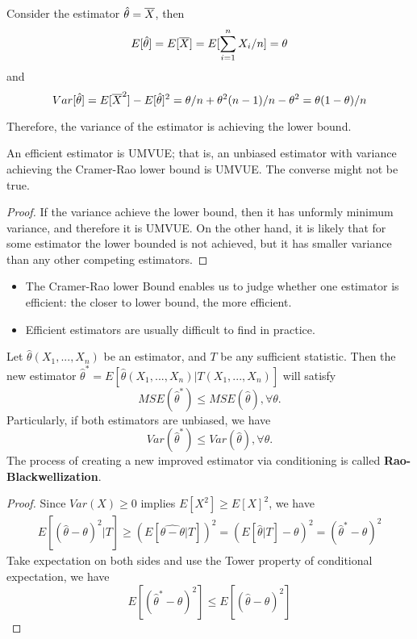 \begin{refsection}
\begin{example}
Consider the estimator $\hat{\theta} = \overline{X}$, then $$E[\hat{\theta}] = E[\overline{X}] = E[\sum_{i=1}^n X_i/n] = \theta$$
and
$$Var[\hat{\theta}] = E[\overline{X}^2] - E[\hat{\theta}]^2 = \theta/n + \theta^2(n-1)/n - \theta^2 = \theta(1-\theta)/n$$

Therefore, the variance of the estimator is achieving the lower bound.
\end{example}

\begin{lemma}
	An efficient estimator is UMVUE; that is, an unbiased estimator with variance achieving the Cramer-Rao lower bound is UMVUE. The converse might not be true.
\end{lemma}
\begin{proof}
	If the variance achieve the lower bound, then it has unformly minimum variance, and therefore it is UMVUE. On the other hand, it is likely that for some estimator the lower bounded is not achieved, but it has smaller variance than any other competing estimators.
\end{proof}

\begin{remark}\hfill
	\begin{itemize}
		\item The Cramer-Rao lower Bound enables us to judge whether one estimator is efficient: the closer to lower bound, the more efficient.
		\item Efficient estimators are usually difficult to find in practice.
	\end{itemize}
\end{remark}



\begin{theorem}
	Let $\hat{\theta}(X_1,...,X_n)$ be an estimator, and $T$ be any sufficient statistic. Then the new estimator $\hat{\theta}^* = E[\hat{\theta}(X_1,...,X_n)|T(X_1,...,X_n)]$ will satisfy
	$$MSE(\hat{\theta}^*) \leq MSE(\hat{\theta}),\forall \theta.$$
	Particularly, if both estimators are unbiased, we have
		$$Var(\hat{\theta}^*) \leq Var(\hat{\theta}),\forall \theta .$$
	The process of creating a new improved estimator via conditioning is called \textbf{Rao-Blackwellization}.
\end{theorem}
\begin{proof}
Since $Var(X) \geq 0$ implies $E[X^2]\geq E[X]^2$, we have
\begin{align*}
	E[(\hat{\theta} - \theta)^2|T] \geq (E[\hat{\theta - \theta}|T])^2 = (E[\hat{\theta}|T] - \theta)^2 = (\hat{\theta}^* - \theta)^2
\end{align*}	
Take expectation on both sides and use the Tower property of conditional expectation, we have
$$E[(\hat{\theta}^* - \theta)^2] \leq E[(\hat{\theta} - \theta)^2]$$
\end{proof}



\end{refsection}
